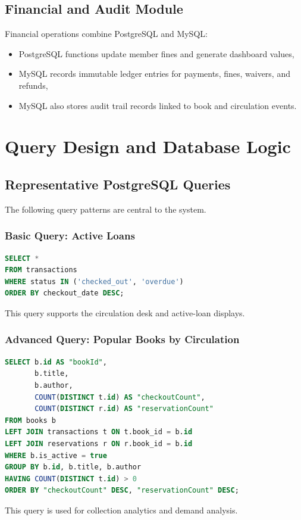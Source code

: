 \documentclass[12pt,a4paper]{report}
\begin{document}
\section{Financial and Audit Module}
Financial operations combine PostgreSQL and MySQL:
\begin{itemize}[leftmargin=1.5em]
    \item PostgreSQL functions update member fines and generate dashboard values,
    \item MySQL records immutable ledger entries for payments, fines, waivers, and refunds,
    \item MySQL also stores audit trail records linked to book and circulation events.
\end{itemize}

\chapter{Query Design and Database Logic}
\section{Representative PostgreSQL Queries}
The following query patterns are central to the system.

\subsection{Basic Query: Active Loans}
\begin{lstlisting}[language=SQL]
SELECT *
FROM transactions
WHERE status IN ('checked_out', 'overdue')
ORDER BY checkout_date DESC;
\end{lstlisting}
This query supports the circulation desk and active-loan displays.

\subsection{Advanced Query: Popular Books by Circulation}
\begin{lstlisting}[language=SQL]
SELECT b.id AS "bookId",
       b.title,
       b.author,
       COUNT(DISTINCT t.id) AS "checkoutCount",
       COUNT(DISTINCT r.id) AS "reservationCount"
FROM books b
LEFT JOIN transactions t ON t.book_id = b.id
LEFT JOIN reservations r ON r.book_id = b.id
WHERE b.is_active = true
GROUP BY b.id, b.title, b.author
HAVING COUNT(DISTINCT t.id) > 0
ORDER BY "checkoutCount" DESC, "reservationCount" DESC;
\end{lstlisting}
This query is used for collection analytics and demand analysis.
\end{document}
